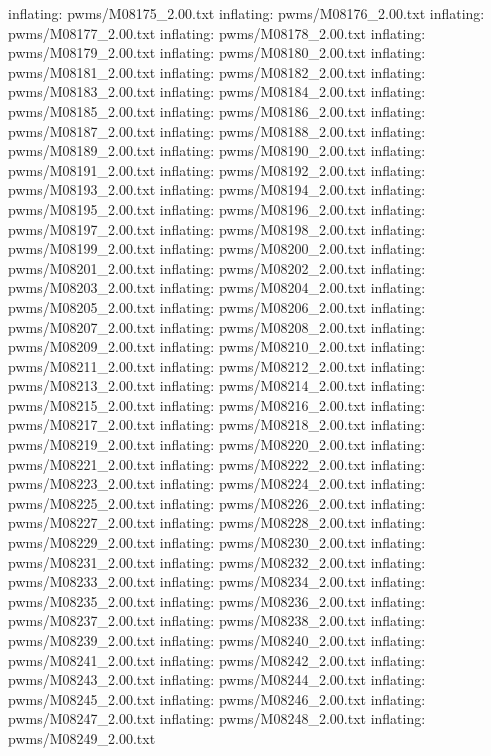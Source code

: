 \documentclass[letterpaper,10pt,english]{sphinxmanual}
\begin{document}
{\begin{sphinxVerbatim}[commandchars=\\\{\}]
  inflating: pwms/M08175\_2.00.txt
  inflating: pwms/M08176\_2.00.txt
  inflating: pwms/M08177\_2.00.txt
  inflating: pwms/M08178\_2.00.txt
  inflating: pwms/M08179\_2.00.txt
  inflating: pwms/M08180\_2.00.txt
  inflating: pwms/M08181\_2.00.txt
  inflating: pwms/M08182\_2.00.txt
  inflating: pwms/M08183\_2.00.txt
  inflating: pwms/M08184\_2.00.txt
  inflating: pwms/M08185\_2.00.txt
  inflating: pwms/M08186\_2.00.txt
  inflating: pwms/M08187\_2.00.txt
  inflating: pwms/M08188\_2.00.txt
  inflating: pwms/M08189\_2.00.txt
  inflating: pwms/M08190\_2.00.txt
  inflating: pwms/M08191\_2.00.txt
  inflating: pwms/M08192\_2.00.txt
  inflating: pwms/M08193\_2.00.txt
  inflating: pwms/M08194\_2.00.txt
  inflating: pwms/M08195\_2.00.txt
  inflating: pwms/M08196\_2.00.txt
  inflating: pwms/M08197\_2.00.txt
  inflating: pwms/M08198\_2.00.txt
  inflating: pwms/M08199\_2.00.txt
  inflating: pwms/M08200\_2.00.txt
  inflating: pwms/M08201\_2.00.txt
  inflating: pwms/M08202\_2.00.txt
  inflating: pwms/M08203\_2.00.txt
  inflating: pwms/M08204\_2.00.txt
  inflating: pwms/M08205\_2.00.txt
  inflating: pwms/M08206\_2.00.txt
  inflating: pwms/M08207\_2.00.txt
  inflating: pwms/M08208\_2.00.txt
  inflating: pwms/M08209\_2.00.txt
  inflating: pwms/M08210\_2.00.txt
  inflating: pwms/M08211\_2.00.txt
  inflating: pwms/M08212\_2.00.txt
  inflating: pwms/M08213\_2.00.txt
  inflating: pwms/M08214\_2.00.txt
  inflating: pwms/M08215\_2.00.txt
  inflating: pwms/M08216\_2.00.txt
  inflating: pwms/M08217\_2.00.txt
  inflating: pwms/M08218\_2.00.txt
  inflating: pwms/M08219\_2.00.txt
  inflating: pwms/M08220\_2.00.txt
  inflating: pwms/M08221\_2.00.txt
  inflating: pwms/M08222\_2.00.txt
  inflating: pwms/M08223\_2.00.txt
  inflating: pwms/M08224\_2.00.txt
  inflating: pwms/M08225\_2.00.txt
  inflating: pwms/M08226\_2.00.txt
  inflating: pwms/M08227\_2.00.txt
  inflating: pwms/M08228\_2.00.txt
  inflating: pwms/M08229\_2.00.txt
  inflating: pwms/M08230\_2.00.txt
  inflating: pwms/M08231\_2.00.txt
  inflating: pwms/M08232\_2.00.txt
  inflating: pwms/M08233\_2.00.txt
  inflating: pwms/M08234\_2.00.txt
  inflating: pwms/M08235\_2.00.txt
  inflating: pwms/M08236\_2.00.txt
  inflating: pwms/M08237\_2.00.txt
  inflating: pwms/M08238\_2.00.txt
  inflating: pwms/M08239\_2.00.txt
  inflating: pwms/M08240\_2.00.txt
  inflating: pwms/M08241\_2.00.txt
  inflating: pwms/M08242\_2.00.txt
  inflating: pwms/M08243\_2.00.txt
  inflating: pwms/M08244\_2.00.txt
  inflating: pwms/M08245\_2.00.txt
  inflating: pwms/M08246\_2.00.txt
  inflating: pwms/M08247\_2.00.txt
  inflating: pwms/M08248\_2.00.txt
  inflating: pwms/M08249\_2.00.txt

\end{sphinxVerbatim}}
\end{document}
